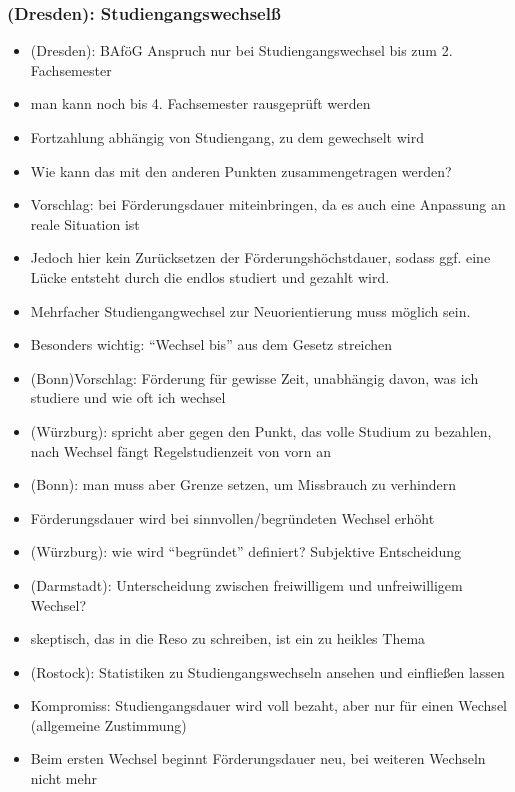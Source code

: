     \subsubsection{(Dresden): Studiengangswechselß}
      \begin{itemize}
        \item (Dresden): BAföG Anspruch nur bei Studiengangswechsel bis zum 2. Fachsemester
        \item man kann noch bis 4. Fachsemester rausgeprüft werden
        \item Fortzahlung abhängig von Studiengang, zu dem gewechselt wird
        \item Wie kann das mit den anderen Punkten zusammengetragen werden?
        \item Vorschlag: bei Förderungsdauer miteinbringen, da es auch eine Anpassung an reale Situation ist
        \item Jedoch hier kein Zurücksetzen der Förderungshöchstdauer, sodass ggf. eine Lücke entsteht durch die endlos studiert und gezahlt wird.
        \item Mehrfacher Studiengangwechsel zur Neuorientierung muss möglich sein.
        \item Besonders wichtig: “Wechsel bis” aus dem Gesetz streichen
        \item (Bonn)Vorschlag: Förderung für gewisse Zeit, unabhängig davon, was ich studiere und wie oft ich wechsel
        \item (Würzburg): spricht aber gegen den Punkt, das volle Studium zu bezahlen, nach Wechsel fängt Regelstudienzeit von vorn an
        \item (Bonn): man muss aber Grenze setzen, um Missbrauch zu verhindern
        \item Förderungsdauer wird bei sinnvollen/begründeten Wechsel erhöht
        \item (Würzburg): wie wird “begründet” definiert? Subjektive Entscheidung
        \item (Darmstadt): Unterscheidung zwischen freiwilligem und unfreiwilligem Wechsel?
        \item skeptisch, das in die Reso zu schreiben, ist ein zu heikles Thema
        \item (Rostock): Statistiken zu Studiengangswechseln ansehen und einfließen lassen
        \item Kompromiss: Studiengangsdauer wird voll bezaht, aber nur für einen Wechsel (allgemeine Zustimmung)
        \item Beim ersten Wechsel beginnt Förderungsdauer neu, bei weiteren Wechseln nicht mehr

\end{itemize}

